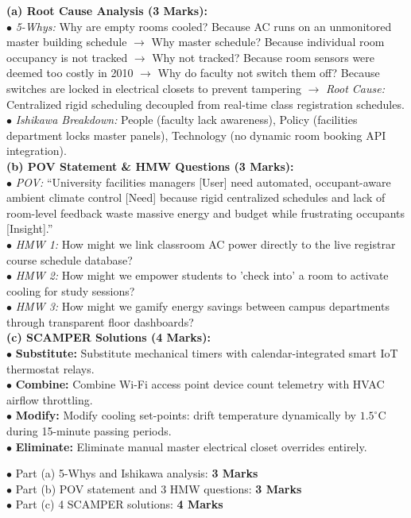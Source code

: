 \begin{solutionbox}
\textbf{(a) Root Cause Analysis (3 Marks):}\\
$\bullet$ \textit{5-Whys:} Why are empty rooms cooled? Because AC runs on an unmonitored master building schedule $\to$ Why master schedule? Because individual room occupancy is not tracked $\to$ Why not tracked? Because room sensors were deemed too costly in 2010 $\to$ Why do faculty not switch them off? Because switches are locked in electrical closets to prevent tampering $\to$ \textit{Root Cause:} Centralized rigid scheduling decoupled from real-time class registration schedules.\\
$\bullet$ \textit{Ishikawa Breakdown:} People (faculty lack awareness), Policy (facilities department locks master panels), Technology (no dynamic room booking API integration).\\
\textbf{(b) POV Statement \& HMW Questions (3 Marks):}\\
$\bullet$ \textit{POV:} ``University facilities managers [User] need automated, occupant-aware ambient climate control [Need] because rigid centralized schedules and lack of room-level feedback waste massive energy and budget while frustrating occupants [Insight].''\\
$\bullet$ \textit{HMW 1:} How might we link classroom AC power directly to the live registrar course schedule database?\\
$\bullet$ \textit{HMW 2:} How might we empower students to 'check into' a room to activate cooling for study sessions?\\
$\bullet$ \textit{HMW 3:} How might we gamify energy savings between campus departments through transparent floor dashboards?\\
\textbf{(c) SCAMPER Solutions (4 Marks):}\\
$\bullet$ \textbf{Substitute:} Substitute mechanical timers with calendar-integrated smart IoT thermostat relays.\\
$\bullet$ \textbf{Combine:} Combine Wi-Fi access point device count telemetry with HVAC airflow throttling.\\
$\bullet$ \textbf{Modify:} Modify cooling set-points: drift temperature dynamically by $1.5^\circ\text{C}$ during 15-minute passing periods.\\
$\bullet$ \textbf{Eliminate:} Eliminate manual master electrical closet overrides entirely.
\begin{markingrubric}
$\bullet$ Part (a) 5-Whys and Ishikawa analysis: \textbf{3 Marks}\\
$\bullet$ Part (b) POV statement and 3 HMW questions: \textbf{3 Marks}\\
$\bullet$ Part (c) 4 SCAMPER solutions: \textbf{4 Marks}
\end{markingrubric}
\end{solutionbox}

